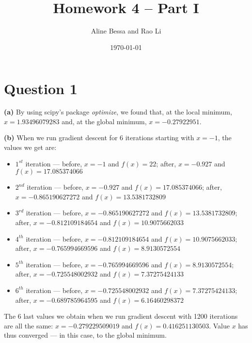 \documentclass[leqno]{article}
\title{Homework 4 -- Part I}
\author{Aline Bessa and Rao Li}
\date\today
\begin{document}
\maketitle %

\section*{Question 1} \textbf{(a)} By using scipy's package \textit{optimize}, we found that, at the local
minimum, $x = 1.93496079283$ and, at the global minimum, $x = -0.27922951$.

\hfill

\noindent \textbf{(b)} When we run gradient descent for 6 iterations starting with $x = -1$, the values we get are:
\begin{itemize}
\item $1^{st}$ iteration --- before, $x = -1$ and $f(x) = 22$; after, $x = -0.927$ and $f(x) = 17.085374066$
\item $2^{nd}$ iteration --- before, $x = -0.927$ and $f(x) = 17.085374066$; after, $x = -0.865190627272$ and $f(x) = 13.5381732809$
\item $3^{rd}$ iteration --- before, $x = -0.865190627272$ and $f(x) = 13.5381732809$; after, $x = -0.812109184654$ and $f(x) = 10.9075662033$
\item $4^{th}$ iteration --- before, $x = -0.812109184654$ and $f(x) = 10.9075662033$; after, $x = -0.765994669596$ and  $f(x) = 8.9130572554$
\item $5^{th}$ iteration --- before, $x = -0.765994669596$ and  $f(x) = 8.9130572554$; after, $x = -0.725548002932$ and $f(x) = 7.37275424133$
\item $6^{th}$ iteration --- before, $x = -0.725548002932$ and $f(x) = 7.37275424133$; after, $x = -0.689785964595$ and $f(x) = 6.16460298372$  
\end{itemize}  
The 6 last values we obtain when we run gradient descent with 1200 iterations are all the same:
$x = -0.279229509019$ and $f(x) = 0.416251130503$. Value $x$ has thus converged --- in this case, to the global minimum.

\hfill
\end{document}
